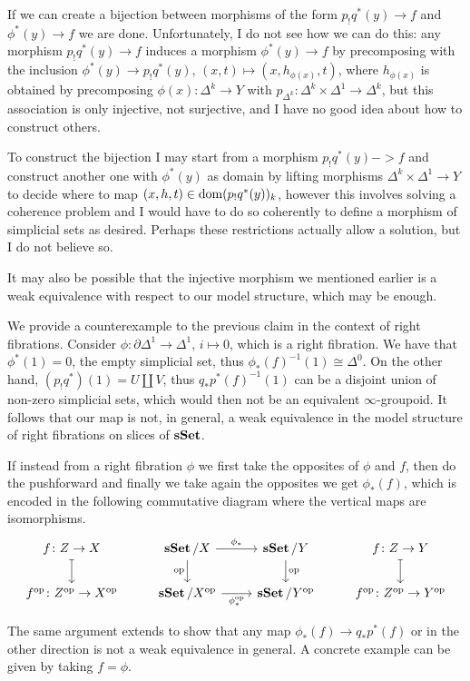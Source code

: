 If we can create a bijection between morphisms of the form $p_!q^*(y)\rightarrow
f$ and $\phi^*(y)\rightarrow f$ we are done. Unfortunately, I do not see how we
can do this: any morphism $p_!q^*(y)\rightarrow f$ induces a
morphism $\phi^*(y)\rightarrow f$ by precomposing with the inclusion
$\phi^*(y)\rightarrow p_!q^*(y)$, $(x,t)\mapsto(x,h_{\phi(x)},t)$, where
$h_{\phi(x)}$ is obtained by precomposing $\phi(x)\colon\Delta^k\rightarrow Y$
with $p_{\Delta^k}\colon\Delta^k\times\Delta^1\rightarrow\Delta^k$, but this
association is only injective, not surjective, and I have no good idea about how
to construct others.

To construct the bijection I may start from a morphism $p_!q^*(y)->f$ and
construct another one with $\phi^*(y)$ as domain by lifting morphisms
$\Delta^k\times\Delta^1\rightarrow Y$ to decide where to map
$(x,h,t)\in\operatorname{dom}(p_!q^*(y))_k$, however this involves solving a coherence problem
and I would have to do so coherently to define a morphism of simplicial sets as
desired. Perhaps these restrictions actually allow a solution, but I do not
believe so.

It may also be possible that the injective morphism we mentioned earlier is a
weak equivalence with respect to our model structure, which may be enough.

We provide a counterexample to the previous claim in the context of right
fibrations. Consider
$\phi\colon\partial\Delta^1\rightarrow\Delta^1$, $i\mapsto 0$, which is a right
fibration. We have that $\phi^*(1)=0$, the empty simplicial set, thus
$\phi_*(f)^{-1}(1)\cong\Delta^0$. On the other hand, $(p_!q^*)(1)=U\amalg V$,
thus $q_*p^*(f)^{-1}(1)$ can be a disjoint union of non-zero simplicial sets,
which would then not be an equivalent $\infty$-groupoid. It follows that our map
is not, in general, a weak equivalence in the model structure of right
fibrations on slices of $\operatorname{\mathbf{sSet}}$. 

If instead from a right fibration $\phi$ we first take the opposites of $\phi$
and $f$, then do the pushforward and finally we take again the opposites we get
$\phi_*(f)$, which is encoded in the following commutative diagram where the
vertical maps are isomorphisms.
\[\begin{tikzcd}
	{f\colon Z\rightarrow X} & {\sSet/X} & {\sSet/Y} & {f\colon Z\rightarrow Y} \\
	{f^{\op}\colon Z^{\op}\rightarrow X^{\op}} & {\sSet/X^{\op}} & {\sSet/Y^{\op}} & {f^{\op}\colon Z^{\op}\rightarrow Y^{\op}}
	\arrow["\op", from=1-3, to=2-3]
	\arrow["\op"', from=1-2, to=2-2]
	\arrow["{\phi^{\op}_*}"', from=2-2, to=2-3]
	\arrow["{\phi_*}", from=1-2, to=1-3]
	\arrow[maps to, from=1-1, to=2-1]
	\arrow[maps to, from=1-4, to=2-4]
\end{tikzcd}\]

The same argument extends to show that any map $\phi_*(f)\rightarrow q_*p^*(f)$
or in the other direction is not a weak equivalence in general. A concrete
example can be given by taking $f=\phi$.


\printbibliography



